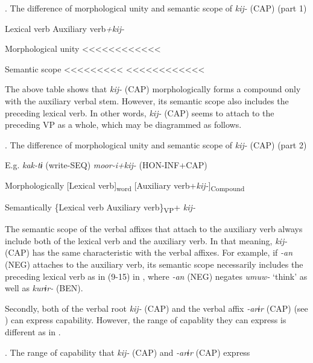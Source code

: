 \begin{styleBeschriftung}
\textmd{. The difference of morphological unity and semantic scope of} \textmd{\textit{kij-}}\textmd{ (CAP) (part 1)}
\end{styleBeschriftung}

  Lexical verb  Auxiliary verb\textit{+kij-}

Morphological unity    <<<<<<<<<<<<

Semantic scope  <<<<<<<<<  <<<<<<<<<<<<

The above table shows that \textit{kij-} (CAP) morphologically forms a compound only with the auxiliary verbal stem. However, its semantic scope also includes the preceding lexical verb. In other words, \textit{kij-} (CAP) seems to attach to the preceding VP as a whole, which may be diagrammed as follows.

\begin{styleBeschriftung}
\textmd{. The difference of morphological unity and semantic scope of} \textmd{\textit{kij-}}\textmd{ (CAP) (part 2)}
\end{styleBeschriftung}

E.g.  \textit{kak-tɨ} (write-SEQ)  \textit{moor-i+kij-} (HON-INF+CAP)

Morphologically  [Lexical verb]\textsubscript{word}  [Auxiliary verb+\textit{kij-}]\textsubscript{Compound}

Semantically  \{Lexical verb  Auxiliary verb\}\textsubscript{VP}+ \textit{kij-}

The semantic scope of the verbal affixes that attach to the auxiliary verb always include both of the lexical verb and the auxiliary verb. In that meaning, \textit{kij-} (CAP) has the same characteristic with the verbal affixes. For example, if \textit{{}-an} (NEG) attaches to the auxiliary verb, its semantic scope necessarily includes the preceding lexical verb as in (9-15) in , where \textit{-an} (NEG) negates \textit{umuw-} ‘think’ as well as \textit{kurɨr-} (BEN).

  Secondly, both of the verbal root \textit{kij-} (CAP) and the verbal affix \textit{{}-arɨr} (CAP) (see ) can express capability. However, the range of capablity they can express is different as in .

\begin{styleBeschriftung}
\textmd{}\textmd{. The range of capability that} \textmd{\textit{kij-}}\textmd{ (CAP) and} \textmd{\textit{{}-arɨr}}\textmd{ (CAP) express}
\end{styleBeschriftung}

